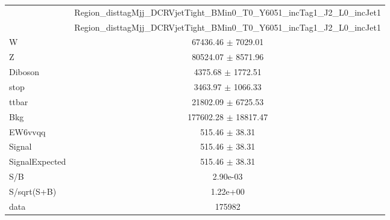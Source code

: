 \documentclass{article}
\begin{document}
\begin{table}
\centering
\small
\begin{tabular}{l|c|}
\cline{2-2}
 & \multicolumn{1}{c|}{Region\_disttagMjj\_DCRVjetTight\_BMin0\_T0\_Y6051\_incTag1\_J2\_L0\_incJet1}\\
\cline{2-2}
 & \multicolumn{1}{c|}{Region\_disttagMjj\_DCRVjetTight\_BMin0\_T0\_Y6051\_incTag1\_J2\_L0\_incJet1}\\ \hline
W & 67436.46 $\pm$ 7029.01\\
Z & 80524.07 $\pm$ 8571.96\\
Diboson & 4375.68 $\pm$ 1772.51\\
stop & 3463.97 $\pm$ 1066.33\\
ttbar & 21802.09 $\pm$ 6725.53\\
\hline
Bkg & 177602.28 $\pm$ 18817.47\\
\hline
EW6vvqq & 515.46 $\pm$ 38.31\\
\hline
Signal & 515.46 $\pm$ 38.31\\
SignalExpected & 515.46 $\pm$ 38.31\\
\hline
S/B & 2.90e-03\\
S/sqrt(S+B) & 1.22e+00\\
\hline
data & 175982\\ \hline
\end{tabular}
\end{table}


\clearpage
\end{document}
